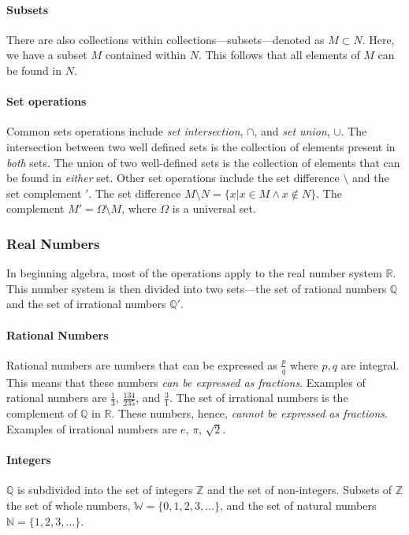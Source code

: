 \paragraph{Subsets}
There are also collections within collections---subsets---denoted as $M \subset N$.
Here, we have a subset $M$ contained within $N$.
This follows that all elements of $M$ can be found in $N$.

\paragraph{Set operations}
Common sets operations include \emph{set intersection}, $\cap$, and \emph{set union}, $\cup$.
The intersection between two well defined sets is the collection of elements present in \emph{both} sets.
The union of two well-defined sets is the collection of elements that can be found in \emph{either} set.
Other set operations include the set difference $\setminus$ and the set complement $'$. The set difference $M \setminus N = \{x | x \in M \land x \notin N\}$. The complement $M' = \Omega \setminus M$, where $\Omega$ is a universal set.

\subsubsection{Real Numbers}
In beginning algebra, most of the operations apply to the real number system $\mathbb{R}$.
This number system is then divided into two sets---the set of rational numbers $\mathbb{Q}$ and the set of irrational numbers $\mathbb{Q}'$.

\paragraph{Rational Numbers}
Rational numbers are numbers that can be expressed as $\frac{p}{q}$ where $p, q$ are integral.
This means that these numbers \emph{can be expressed as fractions}.
Examples of rational numbers are $\frac{1}{3}$, $\frac{134}{235}$, and $\frac{3}{1}$.
The set of irrational numbers is the complement of $\mathbb{Q}$ in $\mathbb{R}$.
These numbers, hence, \emph{cannot be expressed as fractions}.
Examples of irrational numbers are $e$, $\pi$, $\sqrt{2}$.

\paragraph{Integers}
$\mathbb{Q}$ is subdivided into the set of integers $\mathbb{Z}$ and the set of non-integers.
Subsets of $\mathbb{Z}$ the set of whole numbers, $\mathbb{W} = \{0, 1, 2, 3, \ldots\}$, and the set of natural numbers $\mathbb{N} = \{1, 2, 3, \ldots\}$.

